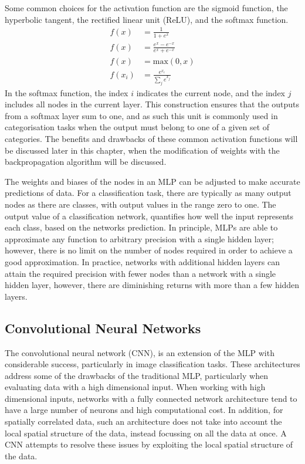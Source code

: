 Some common choices for the activation function are the sigmoid function, the
hyperbolic tangent, the rectified linear unit (ReLU), and the softmax 
function\cite{Lecun2015, He2015, Szegedy2015}.
\begin{align*}
	\tag{Sigmoid} f(x) &= \frac{1}{1+e^x} \\
	\tag{Tanh}    f(x) &= \frac{e^x - e^{-x}}{e^x+e^{-x}} \\
	\tag{ReLU}    f(x) &= \mbox{max}\left( 0, x \right) \\
	\tag{Softmax} f(x_i) &= \frac{e^{x_i}}{\displaystyle\sum_j e^{x_j}}
\end{align*}
In the softmax function, the index $i$ indicates the current node, and the index
$j$ includes all nodes in the current layer. This construction ensures that 
the outputs from a softmax layer sum to one, and as such this unit is commonly 
used in categorisation tasks when the output must belong to one of a given set 
of categories. The benefits and drawbacks of these common activation functions 
will be discussed later in this chapter, when the modification of weights 
with the backpropagation algorithm will be discussed.

The weights and biases of the nodes in an MLP can be adjusted to make accurate 
predictions of data. For a classification task, there are typically as many
output nodes as there are classes, with output values in the range zero to one. 
The output value of a classification network, quantifies how well the input
represents each class, based on the networks prediction. In principle, MLPs 
are able to approximate any function to arbitrary precision with a 
single hidden layer\cite{Cybenko1989ApproximationBS}; however, there is no 
limit on the number of nodes required in order to achieve a good 
approximation. In practice, networks with additional hidden layers can attain 
the required precision with fewer nodes than a network with a single hidden 
layer, however, there are diminishing returns with more than a few hidden 
layers\cite{Reed1999, Lecun2015}.

\subsection{Convolutional Neural Networks}
The convolutional neural network (CNN)\cite{Jackel2008, Szegedy2015, 5537907}, 
is an extension of the MLP with considerable success, particularly in image 
classification tasks. These architectures address some of the drawbacks of the
traditional MLP, particularly when evaluating data with a high dimensional 
input. When working with high dimensional inputs, networks with a fully 
connected network architecture tend to have a large number of neurons and high 
computational cost. In addition, for spatially correlated data, such an 
architecture does not take into account the local spatial structure of the 
data, instead focussing on all the data at once. A CNN attempts to resolve 
these issues by exploiting the local spatial structure of the data.

